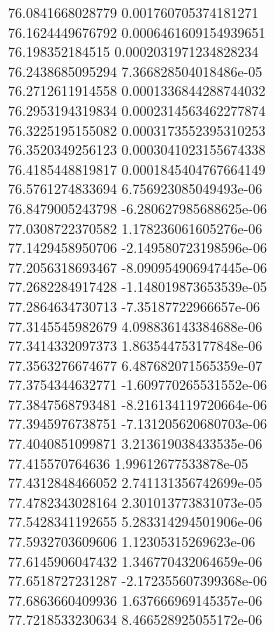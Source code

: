 {76.0841668028779 0.001760705374181271
 \\
76.1624449676792 0.0006461609154939651
 \\
76.198352184515 0.0002031971234828234
 \\
76.2438685095294 7.366828504018486e-05
 \\
76.2712611914558 0.0001336844288744032
 \\
76.2953194319834 0.0002314563462277874
 \\
76.3225195155082 0.0003173552395310253
 \\
76.3520349256123 0.0003041023155674338
 \\
76.4185448819817 0.0001845404767664149
 \\
76.5761274833694 6.756923085049493e-06
 \\
76.8479005243798 -6.280627985688625e-06
 \\
77.0308722370582 1.178236061605276e-06
 \\
77.1429458950706 -2.149580723198596e-06
 \\
77.2056318693467 -8.090954906947445e-06
 \\
77.2682284917428 -1.148019873653539e-05
 \\
77.2864634730713 -7.35187722966657e-06
 \\
77.3145545982679 4.098836143384688e-06
 \\
77.3414332097373 1.863544753177848e-06
 \\
77.3563276674677 6.487682071565359e-07
 \\
77.3754344632771 -1.609770265531552e-06
 \\
77.3847568793481 -8.216134119720664e-06
 \\
77.3945976738751 -7.131205620680703e-06
 \\
77.4040851099871 3.213619038433535e-06
 \\
77.415570764636 1.99612677533878e-05
 \\
77.4312848466052 2.741131356742699e-05
 \\
77.4782343028164 2.301013773831073e-05
 \\
77.5428341192655 5.283314294501906e-06
 \\
77.5932703609606 1.12305315269623e-06
 \\
77.6145906047432 1.346770432064659e-06
 \\
77.6518727231287 -2.172355607399368e-06
 \\
77.6863660409936 1.637666969145357e-06
 \\
77.7218533230634 8.466528925055172e-06
}
